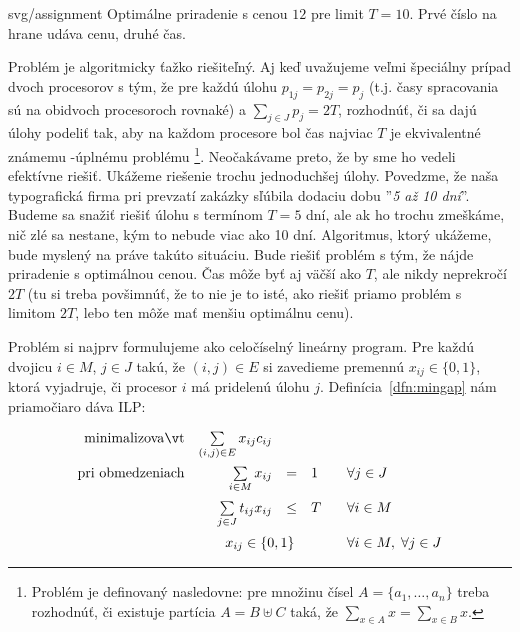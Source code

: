 \begin{myfig}{0.65\textwidth}{svg/assignment}
Optimálne priradenie s cenou $12$ pre limit $T=10$.
Prvé číslo na hrane udáva cenu, druhé čas.
\end{myfig}

\noindent
Problém \mingap je algoritmicky ťažko riešiteľný. Aj keď uvažujeme veľmi špeciálny prípad dvoch procesorov
s tým, že pre každú úlohu $p_{1j}=p_{2j}=p_j$ (t.j. časy spracovania sú na obidvoch procesoroch rovnaké)
a $\sum_{j\in J}p_j=2T$, rozhodnúť, či sa dajú úlohy podeliť tak, aby na každom procesore bol čas najviac $T$
je ekvivalentné známemu \NP-úplnému problému \footnote{
  Problém  je definovaný nasledovne: pre množinu čísel $A=\{a_1,\ldots,a_n\}$
  treba rozhodnúť, či existuje partícia $A=B\uplus C$ taká, že $\sum_{x\in A}x=\sum_{x\in B}x$.
}.
Neočakávame preto, že by sme ho vedeli efektívne riešiť. Ukážeme riešenie trochu jednoduchšej úlohy.
Povedzme, že naša typografická firma pri prevzatí zakázky sľúbila dodaciu dobu ''{\em 5 až 10 dní}''.
Budeme sa snažiť riešiť úlohu s termínom $T=5$ dní, ale ak ho trochu zmeškáme, nič zlé sa nestane, kým
to nebude viac ako 10 dní. Algoritmus, ktorý ukážeme, bude myslený na práve takúto situáciu.
Bude riešiť problém \mingap s tým, že nájde
priradenie s optimálnou cenou. Čas môže byť aj väčší ako $T$, ale nikdy neprekročí $2T$
(tu si treba povšimnúť, že to nie je to isté, ako riešiť priamo problém s limitom $2T$, lebo ten môže
mať menšiu optimálnu cenu).

\noindent
Problém \mingap si najprv formulujeme ako celočíselný lineárny program. Pre každú dvojicu
$i\in M$, $j\in J$ takú, že $(i,j)\in E$ si zavedieme premennú $x_{ij}\in\{0,1\}$, ktorá vyjadruje,
či procesor $i$ má pridelenú úlohu $j$. Definícia~\ref{dfn:mingap} nám priamočiaro dáva ILP:


\begin{equation}
\label{eq:mingap:ilp}
\begin{array}{rrcll}
  {\rm minimalizovať}     & \multicolumn{1}{l}{ \sum\limits_{(i,j)\in E}x_{ij}c_{ij}}\\[3ex]
  {\rm pri\ obmedzeniach} & \sum\limits_{i\in M} x_{ij}& = &1 & \;\;\; \forall j\in J\\[3ex]
                          & \sum\limits_{j\in J} t_{ij}x_{ij}&\le & T & \;\;\; \forall i\in M\\[3ex]
                          & \multicolumn{3}{c}{ x_{ij}\in\{0,1\}} & \;\;\; \forall i\in M, \; \forall j\in J
\end{array}
\end{equation}

